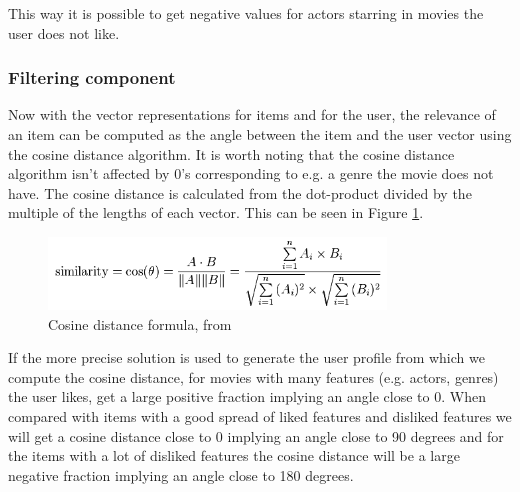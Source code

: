 This way it is possible to get negative values for actors starring in movies the user does not like.

 
\subsubsection{Filtering component}

Now with the vector representations for items and for the user, the relevance of an item can be computed as the angle between the item and the user vector using the cosine distance algorithm. It is worth noting that the cosine distance algorithm isn't affected by 0's corresponding to e.g. a genre the movie does not have. The cosine distance is calculated from the dot-product divided by the multiple of the lengths of each vector. This can be seen in Figure \ref{Cosine}.

\begin{figure}[H]
\centering
\includegraphics[width=0.8\textwidth]{Images/Cosinesimularity.png}
\caption{Cosine distance formula, from \cite{cosSimWiki}}
\label{Cosine}
\end{figure}

If the more precise solution is used to generate the user profile from which we compute the cosine distance, for movies with many features (e.g. actors, genres) the user likes, get a large positive fraction implying an angle close to 0. When compared with items with a good spread of liked features and disliked features we will get a cosine distance close to 0 implying an angle close to 90 degrees and for the items with a lot of disliked features the cosine distance will be a large negative fraction implying an angle close to 180 degrees.